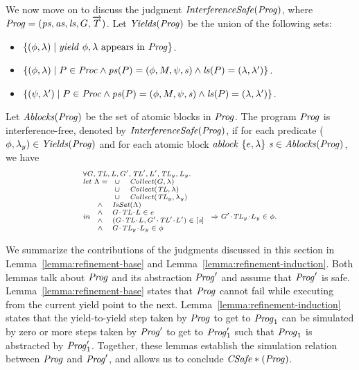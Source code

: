 We now move on to discuss the judgment $\mathit{InterferenceSafe}(\mathit{Prog})$,
where $\mathit{Prog} = (\mathit{ps}, \mathit{as}, \mathit{ls}, G, \overrightarrow{T})$. 
Let $\mathit{Yields}(\mathit{Prog})$ be the union of the following sets:
\begin{itemize}
\item
$\{(\phi,\lambda) \mid \mathit{yield}\ \phi,\lambda~\mathrm{appears~in~\mathit{Prog}}\}$.
\item
$\{(\phi,\lambda) \mid P \in \mathit{Proc} \wedge \mathit{ps}(P) = (\phi, M, \psi, \mathit{s}) \wedge \mathit{ls}(P) = (\lambda,\lambda')\}$.
\item
$\{(\psi,\lambda') \mid P \in \mathit{Proc} \wedge \mathit{ps}(P) = (\phi, M, \psi, \mathit{s}) \wedge \mathit{ls}(P) = (\lambda,\lambda')\}$.
\end{itemize}
Let $\mathit{Ablocks}(\mathit{Prog})$ be the set of atomic blocks in $\mathit{Prog}$.
The program $\mathit{Prog}$ is interference-free, denoted by $\mathit{InterferenceSafe}(\mathit{Prog})$,
if for each predicate ($\phi,\lambda_y) \in \mathit{Yields}(\mathit{Prog})$ and 
for each atomic block $\mathit{ablock}\ {\{e,\lambda\}}\ {\mathit{s}} \in \mathit{Ablocks}(\mathit{Prog})$, we have
\[
\scriptsize{
\begin{array}{l}
\forall \varsG,\varsTL,\varsL,\varsG',\varsTL',\varsL',\varsTL_y,\varsL_y.\\ 
\mathit{let}\ \Lambda =
\begin{array}[t]{ll}
\cup & \Collect(\varsG, \lins) \\
\cup & \Collect(\varsTL, \lins) \\
\cup & \Collect(\varsTL_y, \lins_y) 
\end{array} \\
\mathit{in}\
\begin{array}{ll}
\wedge & \IsSet(\Lambda) \\
\wedge & \MakeStore{\varsG}{\varsTL}{\varsL} \in e \\
\wedge & (\MakeStore{\varsG}{\varsTL}{\varsL}, \MakeStore{\varsG'}{\varsTL'}{\varsL'}) \in \trel{\stmt} \\
\wedge & \MakeStore{\varsG}{\varsTL_y}{\varsL_y} \in \phi
\end{array}
\Rightarrow \MakeStore{\varsG'}{\varsTL_y}{\varsL_y} \in \phi.
\end{array}
}
\]

We summarize the contributions of the judgments discussed in this section in Lemma~\ref{lemma:refinement-base} and Lemma~\ref{lemma:refinement-induction}.
Both lemmas talk about $\mathit{Prog}$ and its abstraction $\mathit{Prog}'$ and assume that $\mathit{Prog}'$ is safe.
Lemma~\ref{lemma:refinement-base} states that $\mathit{Prog}$ cannot fail while executing from the current yield point to the next.
Lemma~\ref{lemma:refinement-induction} states that the yield-to-yield step taken by $\mathit{Prog}$ to get to $\mathit{Prog}_1$ can be simulated by
zero or more steps taken by $\mathit{Prog}'$ to get to $\mathit{Prog}'_1$ such that $\mathit{Prog}_1$ is abstracted by $\mathit{Prog}'_1$.
Together, these lemmas establish the simulation relation between $\mathit{Prog}$ and $\mathit{Prog}'$, and allows us to conclude $\mathit{CSafe}*(\mathit{Prog})$.

